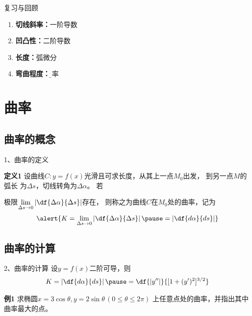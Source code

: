 \begin{frame}{复习与回顾}
	\linespread{1.5}
	
	\begin{enumerate}
	  \item {\bf 切线斜率：}一阶导数
	  \item {\bf 凹凸性：}二阶导数
	  \item {\bf 长度：}弧微分\pause
	  \item {\bf 弯曲程度：}{\b 曲率}
	\end{enumerate}
\end{frame}




\section{曲率}

\subsection{曲率的概念}



\begin{frame}{1、曲率的定义}
	\linespread{1.5}
	\pause
	\begin{block}{{\bf 定义1}\hfill }
		设曲线$C:y=f(x)$光滑且可求长度，从其上一点$M_0$出发，
		到另一点$M$的弧长
		为$\Delta s$，切线转角为$\Delta\alpha$。
		\pause 若
		
		极限$\lim\limits_{\Delta s\to
		0}\left|\df{\Delta\alpha}{\Delta s}\right|$存在，
		则称之为{\bb 曲线$C$在$M_0$处的曲率}，记为
	$$\alert{K=\lim\limits_{\Delta s\to
				0}\left|\df{\Delta\alpha}{\Delta s}\right|\pause
				=\left|\df{d\alpha}{ds}\right|}$$ 
	\end{block}
\end{frame}

\subsection{曲率的计算}

\begin{frame}{2、曲率的计算}
	\linespread{1.2}\pause 
	设$y=f(x)$二阶可导，则
	\alert{$$K=\left|\df{d\alpha}{ds}\right|
				\pause =\df{|y''|}{[1+(y')^2]^{3/2}}$$}\pause 
	\begin{exampleblock}{{\bf 例1}\hfill }
		求椭圆$x=3\cos \theta,y=2\sin \theta\,(0\leq \theta\leq 2\pi)$
		上任意点处的曲率，并指出其中曲率最大的点。
	\end{exampleblock} 
\end{frame}

